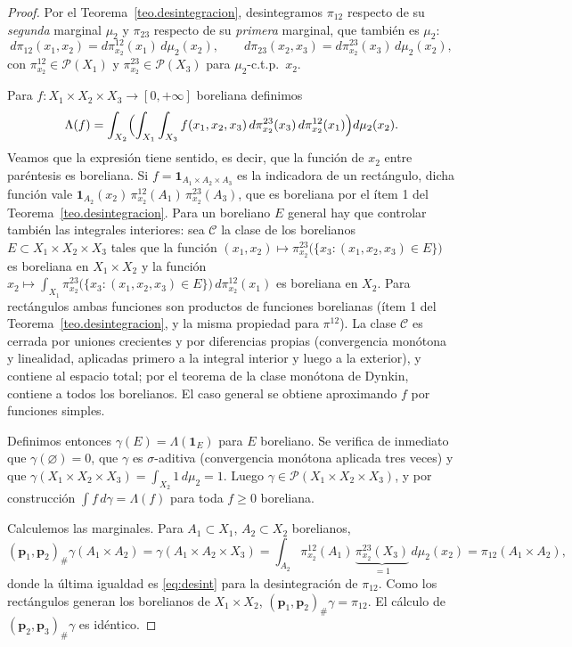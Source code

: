\documentclass[12pt, a4paper]{amsbook}
\newcommand{\pp}{{\mathbf p}}
\theoremstyle{remark}
\theoremstyle{definition}
\numberwithin{section}{chapter}
\numberwithin{subsection}{section}
\numberwithin{equation}{section}
\numberwithin{figure}{chapter}
\begin{document}
\begin{proof}
Por el Teorema~\ref{teo.desintegracion}, desintegramos $\pi_{12}$ respecto de
su \emph{segunda} marginal $\mu_2$ y $\pi_{23}$ respecto de su \emph{primera}
marginal, que también es $\mu_2$:
\[
d\pi_{12}(x_1,x_2)=d\pi^{12}_{x_2}(x_1)\,d\mu_2(x_2),
\qquad
d\pi_{23}(x_2,x_3)=d\pi^{23}_{x_2}(x_3)\,d\mu_2(x_2),
\]
con $\pi^{12}_{x_2}\in\mathcal P(X_1)$ y $\pi^{23}_{x_2}\in\mathcal P(X_3)$
para $\mu_2$-c.t.p.\ $x_2$.

Para $f\colon X_1\times X_2\times X_3\to[0,+\infty]$ boreliana definimos
\begin{equation}\label{eq:pegado.def}
\Lambda(f)
=
\int_{X_2}\Bigl(\int_{X_1}\int_{X_3}f(x_1,x_2,x_3)\,d\pi^{23}_{x_2}(x_3)\,d\pi^{12}_{x_2}(x_1)\Bigr)d\mu_2(x_2).
\end{equation}
Veamos que la expresión tiene sentido, es decir, que la función de $x_2$ entre
paréntesis es boreliana. Si $f=\mathbf 1_{A_1\times A_2\times A_3}$ es la
indicadora de un rectángulo, dicha función vale
$\mathbf 1_{A_2}(x_2)\,\pi^{12}_{x_2}(A_1)\,\pi^{23}_{x_2}(A_3)$, que es
boreliana por el ítem 1 del Teorema~\ref{teo.desintegracion}. Para un
boreliano $E$ general hay que controlar también las integrales interiores:
sea $\mathcal C$ la clase de los borelianos $E\subset X_1\times X_2\times X_3$
tales que la función
$(x_1,x_2)\mapsto\pi^{23}_{x_2}\bigl(\{x_3:(x_1,x_2,x_3)\in E\}\bigr)$ es
boreliana en $X_1\times X_2$ y la función
$x_2\mapsto\int_{X_1}\pi^{23}_{x_2}\bigl(\{x_3:(x_1,x_2,x_3)\in E\}\bigr)\,d\pi^{12}_{x_2}(x_1)$
es boreliana en $X_2$. Para rectángulos ambas funciones son productos de
funciones borelianas (ítem 1 del Teorema~\ref{teo.desintegracion}, y la
misma propiedad para $\pi^{12}$). La clase $\mathcal C$ es cerrada por uniones
crecientes y por diferencias propias (convergencia monótona y linealidad,
aplicadas primero a la integral interior y luego a la exterior), y contiene
al espacio total; por el teorema de la clase monótona de Dynkin, contiene a
todos los borelianos. El caso general se obtiene aproximando $f$ por
funciones simples.

Definimos entonces $\gamma(E)=\Lambda(\mathbf 1_E)$ para $E$ boreliano. Se
verifica de inmediato que $\gamma(\varnothing)=0$, que $\gamma$ es
$\sigma$-aditiva (convergencia monótona aplicada tres veces) y que
$\gamma(X_1\times X_2\times X_3)=\int_{X_2}1\,d\mu_2=1$. Luego
$\gamma\in\mathcal P(X_1\times X_2\times X_3)$, y por construcción
$\int f\,d\gamma=\Lambda(f)$ para toda $f\ge0$ boreliana.

Calculemos las marginales. Para $A_1\subset X_1$, $A_2\subset X_2$ borelianos,
\[
(\pp_1,\pp_2)_\#\gamma(A_1\times A_2)
=\gamma(A_1\times A_2\times X_3)
=\int_{A_2}\pi^{12}_{x_2}(A_1)\,\underbrace{\pi^{23}_{x_2}(X_3)}_{=1}\,d\mu_2(x_2)
=\pi_{12}(A_1\times A_2),
\]
donde la última igualdad es \eqref{eq:desint} para la desintegración de
$\pi_{12}$. Como los rectángulos generan los borelianos de $X_1\times X_2$,
$(\pp_1,\pp_2)_\#\gamma=\pi_{12}$. El cálculo de $(\pp_2,\pp_3)_\#\gamma$ es
idéntico.
\end{proof}
\end{document}
